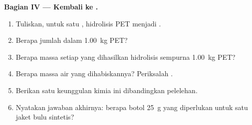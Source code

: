 \begin{problem}
\medskip
\noindent\textbf{Bagian IV --- Kembali ke .}
\begin{enumerate}[resume]
  \item Tuliskan, untuk satu , hidrolisis PET menjadi
        .
  \item Berapa jumlah  dalam \qty{1.00}{kg} PET?
  \item Berapa massa setiap  yang dihasilkan hidrolisis sempurna
        \qty{1.00}{kg} PET?
  \item Berapa massa air yang dihabiskannya? Periksalah .
  \item Berikan satu keunggulan  kimia ini dibandingkan
        pelelehan.
  \item Nyatakan jawaban akhirnya: berapa botol \qty{25}{g} yang
        diperlukan untuk satu jaket bulu sintetis?
\end{enumerate}
\end{problem}

